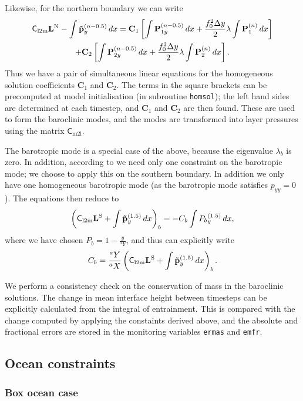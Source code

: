 \documentclass[11pt, a4paper,twoside]{article}
\newcommand{\vc}[1]{\mathbf{#1}}
\newcommand{\mtx}[1]{\vc{\mathsf{#1}}}
\newcommand{\cml}[0]{\mtx{C}_{\mathrm{m2l}}}
\newcommand{\clm}[0]{\mtx{C}_{\mathrm{l2m}}}
\numberwithin{equation}{section}
\begin{document}
Likewise, for the northern boundary we can write
\begin{multline}
\clm \vc{L}^{\textrm N} - \int \vc{\tilde{p}}_{y}^{(n-0.5)} \, dx =  \vc{C}_{1} \left[\int \vc{P}_{1y}^{(n-0.5)} \, dx + \frac{f_0^2 \Delta y}{2} \vc{\lambda} \int \vc{P}_{1}^{(n)}  \, dx\right] \\
+  \vc{C}_{2} \left[\int \vc{P}_{2y}^{(n-0.5)} \, dx  + \frac{f_0^2 \Delta y}{2} \vc{\lambda} \int \vc{P}_{2}^{(n)} \, dx \right] .
\end{multline}
Thus we have a pair of simultaneous linear equations for the homogeneous solution coefficients $\vc{C}_{1}$ and  $\vc{C}_{2}$.
The terms in the square brackets can be precomputed at model initialisation (in subroutine \verb=homsol=); the left hand sides are determined at each timestep, and  $\vc{C}_{1}$ and  $\vc{C}_{2}$ are then found.
These are used to form the baroclinic modes, and the modes are transformed into layer pressures using the matrix $\cml$.

The barotropic mode is a special case of the above, because the eigenvalue $\lambda_b$ is zero.
In addition, according to \citet{mcwilliams:77} we need only one constraint on the barotropic mode; we choose to apply this on the southern boundary.
In addition we only have one homogeneous barotropic mode (as the barotropic mode satisfies $p_{yy}=0$).
The equations then reduce to
\[\left(\clm \vc{L}^{\textrm S} + \int \vc{\tilde{p}}_{y}^{(1.5)} \, dx\right)_b =  - C_{b} \int {P_{b}}_{y}^{(1.5)} \, dx  ,\]
where we have chosen $P_b = 1-\tfrac{y}{{}^aY}$, and thus can explicitly write
\[C_{b} =  \frac{{}^aY}{{}^aX}\left(\clm \vc{L}^{\textrm S} + \int \vc{\tilde{p}}_{y}^{(1.5)} \, dx\right)_b.\]

We perform a consistency check on the conservation of mass in the baroclinic solutions.
The change in mean interface height between timesteps can be explicitly calculated from the integral of entrainment.
This is compared with the change computed by applying the constaints  derived above, and the absolute and fractional errors are stored in the monitoring variables \verb=ermas= and \verb=emfr=.


\subsection{Ocean constraints}\label{app:occon}

\subsubsection{Box ocean case}\label{app:boxcon}
\end{document}
